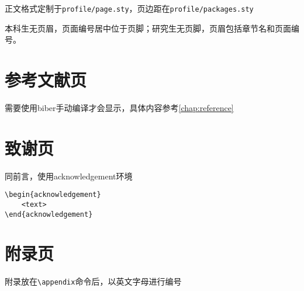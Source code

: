 正文格式定制于\texttt{profile/page.sty}，页边距在\texttt{profile/packages.sty}

本科生无页眉，页面编号居中位于页脚；研究生无页脚，页眉包括章节名和页面编号。


\section{参考文献页}

需要使用biber手动编译才会显示，具体内容参考\cref{chap:reference}

\section{致谢页}

同前言，使用acknowledgement环境

\begin{lstlisting}
\begin{acknowledgement}
    <text>
\end{acknowledgement}
\end{lstlisting}

\section{附录页}

附录放在\lstinline|\appendix|命令后，以英文字母进行编号
